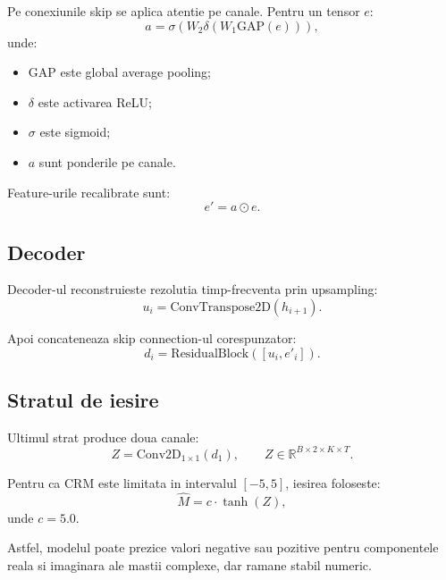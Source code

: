 \documentclass[12pt,a4paper]{article}
\begin{document}
Pe conexiunile skip se aplica atentie pe canale. Pentru un tensor $e$:
\begin{equation}
    a = \sigma(W_2 \delta(W_1 \mathrm{GAP}(e))),
\end{equation}
unde:
\begin{itemize}
    \item $\mathrm{GAP}$ este global average pooling;
    \item $\delta$ este activarea ReLU;
    \item $\sigma$ este sigmoid;
    \item $a$ sunt ponderile pe canale.
\end{itemize}

Feature-urile recalibrate sunt:
\begin{equation}
    e' = a \odot e.
\end{equation}

\subsection{Decoder}

Decoder-ul reconstruieste rezolutia timp-frecventa prin upsampling:
\begin{equation}
    u_i = \mathrm{ConvTranspose2D}(h_{i+1}).
\end{equation}

Apoi concateneaza skip connection-ul corespunzator:
\begin{equation}
    d_i = \mathrm{ResidualBlock}([u_i, e'_i]).
\end{equation}

\subsection{Stratul de iesire}

Ultimul strat produce doua canale:
\begin{equation}
    Z = \mathrm{Conv2D}_{1 \times 1}(d_1),
    \qquad
    Z \in \mathbb{R}^{B \times 2 \times K \times T}.
\end{equation}

Pentru ca CRM este limitata in intervalul $[-5,5]$, iesirea foloseste:
\begin{equation}
    \hat{M} = c \cdot \tanh(Z),
\end{equation}
unde $c=5.0$.

Astfel, modelul poate prezice valori negative sau pozitive pentru componentele
reala si imaginara ale mastii complexe, dar ramane stabil numeric.
\end{document}
